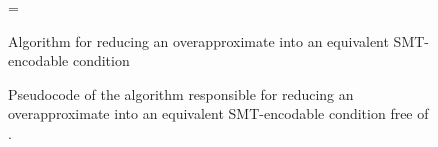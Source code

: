 \begin{figure}
\begin{algorithm}[H]
\begin{footnotesize}
\DontPrintSemicolon
\everypar={\nl}
\SetAlgoLined
{}
\end{footnotesize}
\caption{Algorithm for reducing an overapproximate \recursiveRelation{} into an equivalent SMT-encodable condition}
\end{algorithm}
\caption{\label{algo:overapprox}Pseudocode of the algorithm responsible for reducing an overapproximate \recursiveRelation{}
into an equivalent SMT-encodable condition free of \recursiveRelations{}.}
\end{figure}
